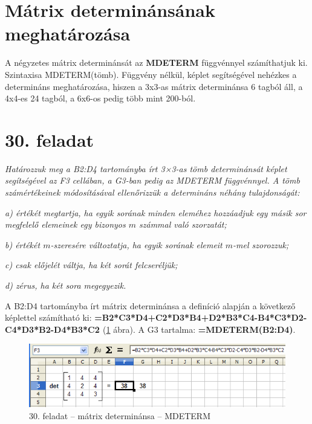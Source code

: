 \section[Mátrix determinánsának meghatározása]{Mátrix
determinánsának meghatározása}

A négyzetes mátrix determinánsát az \textbf{MDETERM}
függvénnyel számíthatjuk ki. Szintaxisa MDETERM(tömb).
Függvény nélkül, képlet segítségével nehézkes a
determináns meghatározása, hiszen a 3x3-as mátrix
determinánsa 6 tagból áll, a 4x4-es 24 tagból, a 6x6-os pedig
több mint 200-ból. 

\section{30. feladat}

{\itshape
Határozzuk meg a B2:D4 tartományba írt 3×3-as tömb
determinánsát képlet segítségével az F3 cellában, a
G3-ban pedig az MDETERM függvénnyel. A tömb számértékeinek
módosításával ellenőrizzük a determináns néhány
tulajdonságát:}

{\itshape
a) értékét megtartja, ha egyik sorának minden eleméhez
hozzáadjuk egy másik sor megfelelő elemeinek egy bizonyos $m$
számmal való szorzatát;}

{\itshape
b) értékét $m$-szeresére változtatja, ha egyik sorának elemeit
$m$-mel szorozzuk;}

{\itshape
c) csak előjelét váltja, ha két sorát felcseréljük;}

{\itshape
d) zérus, ha két sora megegyezik.}

A B2:D4 tartományba írt mátrix determinánsa a definíció
alapján a következő képlettel számítható ki:
{\sffamily\bfseries{=B2*C3*D4+C2*D3*B4+D2*B3*C4-B4*C3*D2-C4*D3*B2-D4*B3*C2 }}
(\ref{30-feladatMátrixMDETERM} ábra).
A G3 tartalma: {\sffamily\bfseries{=MDETERM(B2:D4)}}.

\begin{figure}[!h]
\begin{center}
\includegraphics[width=12.974cm]{oocalcv2-img135.png}
\caption{30. feladat --  mátrix determinánsa --  MDETERM}\label{30-feladatMátrixMDETERM}
\end{center}
\end{figure}



